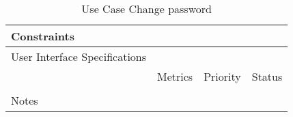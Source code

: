 \begin{table}[H]
\begin{tabularx}{\linewidth}{|l|X|X|X|}
    \hline Constraints                   & \multicolumn{3}{l|}{}                                                                                 \\

    \hline User Interface Specifications & \multicolumn{3}{l|}{}                                                                                 \\

    \hline \multirow{2}{*}{}             & Metrics                                                                           & Priority & Status \\
    \cline{2-4}                          &                                                                                   &          &        \\
    \hline Notes                         & \multicolumn{3}{l|}{}                                                                                 \\
    \hline
  \end{tabularx}
  \caption{Use Case Change password}
  \label{tab:use_case_change_password}
\end{table}


